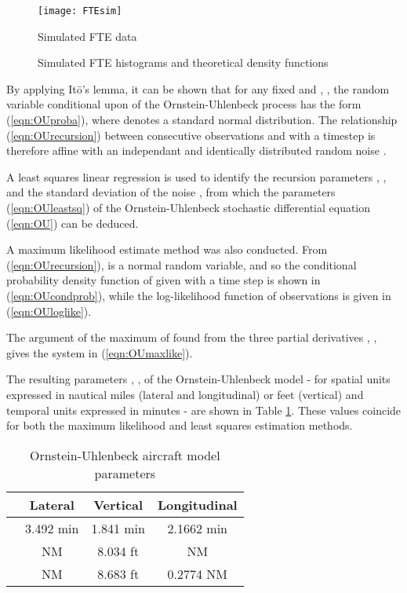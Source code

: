 \documentclass[conference]{IEEEtran}
\begin{document}
\begin{figure}[!h]
\centering
\texttt{[image: FTEsim]}
\caption{Simulated FTE data}
\label{fig:FTEsim}
\end{figure}

\begin{figure}[!h]
\centering
{}
\caption{Simulated FTE histograms and theoretical density functions}
\label{fig:FTEhist}
\end{figure}


By applying It\={o}'s lemma, it can be shown that for any fixed  and , , the random variable  conditional upon  of the Ornstein-Uhlenbeck process has the form (\ref{eqn:OUproba}), where  denotes a standard normal distribution. The relationship (\ref{eqn:OUrecursion}) between consecutive observations  and  with a timestep  is therefore affine with an independant and identically distributed random noise . 

A least squares linear regression is used to identify the recursion parameters , , and the standard deviation of the noise , from which the parameters (\ref{eqn:OUleastsq}) of the Ornstein-Uhlenbeck stochastic differential equation (\ref{eqn:OU}) can be deduced.


A maximum likelihood estimate method was also conducted. From (\ref{eqn:OUrecursion}),  is a normal random variable, and so the conditional probability density function of  given  with a time step  is shown in (\ref{eqn:OUcondprob}), while the log-likelihood function of  observations  is given in (\ref{eqn:OUloglike}).




The argument of the maximum of  found from the three partial derivatives , ,  gives the system in (\ref{eqn:OUmaxlike}).



The resulting parameters , ,  of the Ornstein-Uhlenbeck model - for spatial units expressed in nautical miles (lateral and longitudinal) or feet (vertical) and temporal units expressed in minutes - are shown in Table \ref{tab:OUparam}. These values coincide for both the maximum likelihood and least squares estimation methods.

\begin{table}
\caption{Ornstein-Uhlenbeck aircraft model parameters}
\label{tab:OUparam}
\centering
\begin{tabular}{|c|c|c|c|}
\hline\hline
&Lateral&Vertical&Longitudinal \bigstrut\\ \hline\hline
 & 3.492 min& 1.841 min&2.1662 min \bigstrut \\ \hline
 &  NM & 8.034 ft&  NM \bigstrut \\ \hline
 &  NM& 8.683 ft& 0.2774 NM \bigstrut\\ \hline \hline
\end{tabular}
\end{table}
\end{document}
